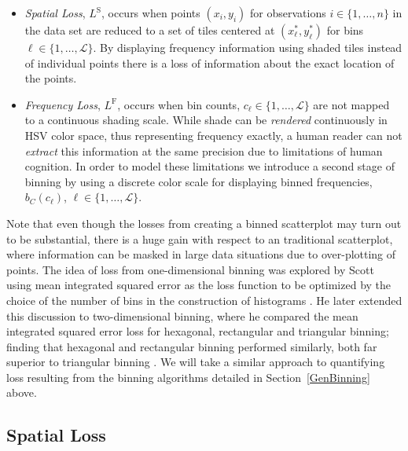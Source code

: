 \documentclass[11pt]{isuthesis}\usepackage[]{graphicx}\usepackage[]{color}
\newcommand{\hh}[1]{{\color{ForestGreen} #1}}
\begin{document}
\begin{itemize}
\item {\it Spatial Loss}, $L^\text{S}$, occurs when points $(x_i, y_i)$ for observations $i \in \{1,\dots,n\}$ in the data set are reduced to a set of tiles centered at $(x_\ell^\ast, y_\ell^\ast)$ for bins $\ell \in \{1,\dots,\mathscr{L}\}$. By displaying frequency information using shaded tiles instead of individual points there is a loss of information about the exact location of the points. %

\item {\it Frequency Loss}, $L^\text{F}$, occurs when bin counts, $c_\ell \in \{1,\dots,\mathscr{L}\}$ are not mapped to a continuous shading scale. While shade can be \textit{rendered} continuously in HSV color space, thus representing frequency exactly, a human reader can not \textit{extract} this information at the same precision due to limitations of  human cognition.  %
In order to model these limitations we 
introduce a second stage of binning by using a discrete color scale for displaying binned frequencies, $b_C(c_\ell)$, $\ell \in \{1,\dots,\mathscr{L}\}$. %
\end{itemize}

Note that even though the losses from creating a binned scatterplot may turn out to be substantial, there is a huge gain with respect to an traditional scatterplot, where information can be masked in large data situations due to over-plotting of points. The idea of loss from one-dimensional binning was explored by Scott using mean integrated squared error as the loss function to be optimized by the choice of the number of bins in  the construction of histograms \citep{scott1979}. He later extended this discussion to two-dimensional binning, where he compared the mean integrated squared error loss for hexagonal, rectangular and triangular binning; finding that hexagonal and rectangular binning performed similarly, both far superior to triangular binning \citep{scott1992}. We will take a similar approach to quantifying loss resulting from the binning algorithms detailed in Section~\ref{GenBinning} above. 

\subsection{Spatial Loss}
\label{SpatialLoss}
\end{document}
